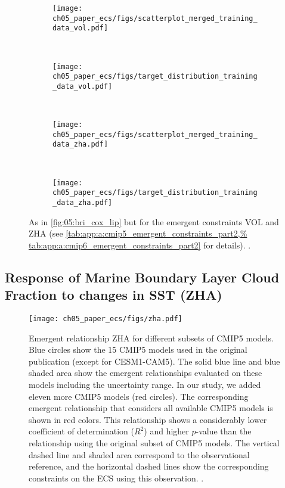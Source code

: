 \begin{figure}[t]
  \centering
  \begin{subfigure}[b]{\SubfigureWidth{}}
    \texttt{[image: 
      ch05\_paper\_ecs/figs/scatterplot\_merged\_training\_data\_vol.pdf]}
    \caption{}
    \label{fig:05:vol_zha:a}
  \end{subfigure}
  ~
  \begin{subfigure}[b]{\SubfigureWidth{}}
    \texttt{[image: 
      ch05\_paper\_ecs/figs/target\_distribution\_training\_data\_vol.pdf]}
    \caption{}
    \label{fig:05:vol_zha:b}
  \end{subfigure}
  \\
  \begin{subfigure}[b]{\SubfigureWidth{}}
    \texttt{[image: 
      ch05\_paper\_ecs/figs/scatterplot\_merged\_training\_data\_zha.pdf]}
    \caption{}
    \label{fig:05:vol_zha:c}
  \end{subfigure}
  ~
  \begin{subfigure}[b]{\SubfigureWidth{}}
    \texttt{[image: 
      ch05\_paper\_ecs/figs/target\_distribution\_training\_data\_zha.pdf]}
    \caption{}
    \label{fig:05:vol_zha:d}
  \end{subfigure}
  \caption[
    As in \cref{fig:05:bri_cox_lip} but for the emergent constraints VOL and
    ZHA.
  ]{
    As in \cref{fig:05:bri_cox_lip} but for the emergent constraints VOL and
    ZHA (see \cref{tab:app:a:cmip5_emergent_constraints_part2,%
      tab:app:a:cmip6_emergent_constraints_part2} for details).
    .
  }
  \label{fig:05:vol_zha}
\end{figure}


\subsection{Response of Marine Boundary Layer Cloud Fraction to changes in
  \acl{SST} (ZHA)}
\label{subsec:05:zha}

\begin{figure}[t]
  \centering
  \texttt{[image: ch05\_paper\_ecs/figs/zha.pdf]}
  \caption[
    Emergent relationship ZHA for different subsets of \acs{CMIP}5 models.
  ]{
    Emergent relationship ZHA \autocite{Zhai2015} for different subsets of
    \acs{CMIP}5 models. Blue circles show the 15 \acs{CMIP}5 models used in the
    original publication (except for \acs{CESM}1-CAM5). The solid blue line and
    blue shaded area show the emergent relationships evaluated on these models
    including the uncertainty range. In our study, we added eleven more
    \acs{CMIP}5 models (red circles). The corresponding emergent relationship
    that considers all available \acs{CMIP}5 models is shown in red colors.
    This relationship shows a considerably lower coefficient of determination
    ($R^2$) and higher $p$-value than the relationship using the original
    subset of \acs{CMIP}5 models. The vertical dashed line and shaded area
    correspond to the observational reference, and the horizontal dashed lines
    show the corresponding constraints on the \acf{ECS} using this observation.
    .
  }
  \label{fig:05:zha}
\end{figure}


